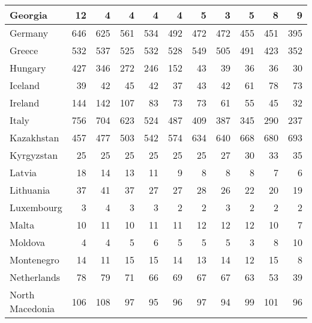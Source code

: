 \begin{table}
\begin{tabular}{|l|r|r|r|r|r|r|r|r|r|r|}
                       Georgia&     12&      4&      4&      4&      4&      5&      3&      5&      8&      9\\\hline
                       Germany&    646&    625&    561&    534&    492&    472&    472&    455&    451&    395\\\hline
                        Greece&    532&    537&    525&    532&    528&    549&    505&    491&    423&    352\\\hline
                       Hungary&    427&    346&    272&    246&    152&     43&     39&     36&     36&     30\\\hline
                       Iceland&     39&     42&     45&     42&     37&     43&     42&     61&     78&     73\\\hline
                       Ireland&    144&    142&    107&     83&     73&     73&     61&     55&     45&     32\\\hline
                         Italy&    756&    704&    623&    524&    487&    409&    387&    345&    290&    237\\\hline
                    Kazakhstan&    457&    477&    503&    542&    574&    634&    640&    668&    680&    693\\\hline
                    Kyrgyzstan&     25&     25&     25&     25&     25&     25&     27&     30&     33&     35\\\hline
                        Latvia&     18&     14&     13&     11&      9&      8&      8&      8&      7&      6\\\hline
                     Lithuania&     37&     41&     37&     27&     27&     28&     26&     22&     20&     19\\\hline
                    Luxembourg&      3&      4&      3&      3&      2&      2&      3&      2&      2&      2\\\hline
                         Malta&     10&     11&     10&     11&     11&     12&     12&     12&     10&      7\\\hline
                       Moldova&      4&      4&      5&      6&      5&      5&      5&      3&      8&     10\\\hline
                    Montenegro&     14&     11&     15&     15&     14&     13&     14&     12&     15&      8\\\hline
                   Netherlands&     78&     79&     71&     66&     69&     67&     67&     63&     53&     39\\\hline
               North Macedonia&    106&    108&     97&     95&     96&     97&     94&     99&    101&     96\\\hline

\end{tabular}
\end{table}
